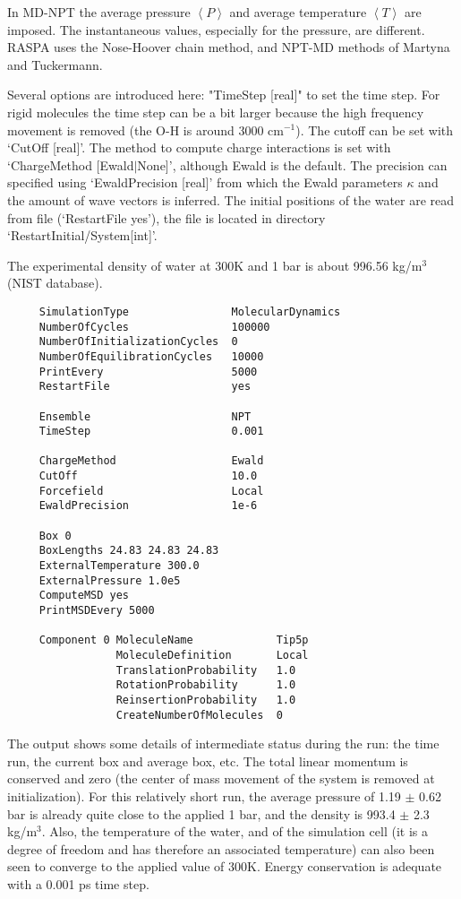 In MD-NPT the average pressure
$\left\langle P\right\rangle$ and average temperature $\left\langle T\right\rangle$ are imposed. The instantaneous
values, especially for the pressure, are different. RASPA uses the Nose-Hoover chain method, and NPT-MD methods of
Martyna and Tuckermann.

Several options are introduced here: "TimeStep [real]" to set the time step. For rigid molecules the time step can be a bit larger
because the high frequency movement is removed (the O-H is around 3000 cm$^{-1}$). The cutoff can be set with `CutOff [real]'.
The method to compute charge interactions is set with `ChargeMethod [Ewald$|$None]', although Ewald is the default. The precision can specified
using `EwaldPrecision [real]' from which the Ewald parameters $\kappa$ and the amount of wave vectors is inferred.
The initial positions of the water are read from file (`RestartFile yes'), the file is located in directory `RestartInitial/System[int]'.

The experimental density of water at 300K and 1 bar is about 996.56 kg/m$^3$ (NIST database).

\begin{tiny}
\begin{verbatim}
     SimulationType                MolecularDynamics
     NumberOfCycles                100000
     NumberOfInitializationCycles  0
     NumberOfEquilibrationCycles   10000
     PrintEvery                    5000
     RestartFile                   yes

     Ensemble                      NPT
     TimeStep                      0.001

     ChargeMethod                  Ewald
     CutOff                        10.0
     Forcefield                    Local
     EwaldPrecision                1e-6

     Box 0
     BoxLengths 24.83 24.83 24.83
     ExternalTemperature 300.0
     ExternalPressure 1.0e5
     ComputeMSD yes
     PrintMSDEvery 5000

     Component 0 MoleculeName             Tip5p
                 MoleculeDefinition       Local
                 TranslationProbability   1.0
                 RotationProbability      1.0
                 ReinsertionProbability   1.0
                 CreateNumberOfMolecules  0
\end{verbatim}
\end{tiny}

The output shows some details of intermediate status during the run: the time run, the current box and average box, etc.
The total linear momentum is conserved and zero (the center of mass movement of the system is removed at initialization).
For this relatively short run, the average pressure of 1.19 $\pm$ 0.62 bar is already quite close to the applied 1 bar,
and the density is 993.4 $\pm$ 2.3 kg/m$^3$.
Also, the temperature of the water, and of the simulation cell (it is a degree of freedom and has therefore an associated temperature)
can also been seen to converge to the applied value of 300K. Energy conservation is adequate with a 0.001 ps time step.


